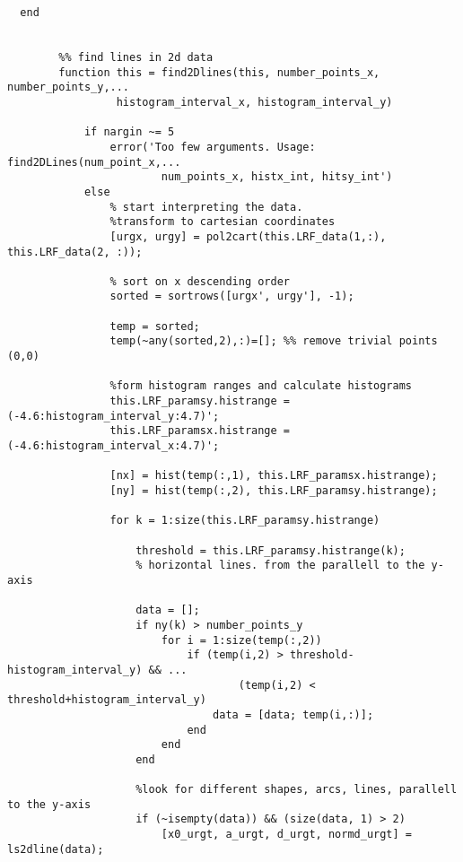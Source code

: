 \begin{lstlisting}
  end
        
        
        %% find lines in 2d data
        function this = find2Dlines(this, number_points_x, number_points_y,...
                 histogram_interval_x, histogram_interval_y)
            
            if nargin ~= 5
                error('Too few arguments. Usage: find2DLines(num_point_x,...
                        num_points_x, histx_int, hitsy_int')
            else
                % start interpreting the data.
                %transform to cartesian coordinates
                [urgx, urgy] = pol2cart(this.LRF_data(1,:), this.LRF_data(2, :));
                
                % sort on x descending order
                sorted = sortrows([urgx', urgy'], -1);
                
                temp = sorted;
                temp(~any(sorted,2),:)=[]; %% remove trivial points (0,0)
                
                %form histogram ranges and calculate histograms
                this.LRF_paramsy.histrange = (-4.6:histogram_interval_y:4.7)';
                this.LRF_paramsx.histrange = (-4.6:histogram_interval_x:4.7)';
                
                [nx] = hist(temp(:,1), this.LRF_paramsx.histrange);
                [ny] = hist(temp(:,2), this.LRF_paramsy.histrange);
                
                for k = 1:size(this.LRF_paramsy.histrange)
                    
                    threshold = this.LRF_paramsy.histrange(k);
                    % horizontal lines. from the parallell to the y-axis
                    
                    data = [];
                    if ny(k) > number_points_y
                        for i = 1:size(temp(:,2))
                            if (temp(i,2) > threshold-histogram_interval_y) && ...
                                    (temp(i,2) < threshold+histogram_interval_y)
                                data = [data; temp(i,:)];
                            end
                        end
                    end
                    
                    %look for different shapes, arcs, lines, parallell to the y-axis
                    if (~isempty(data)) && (size(data, 1) > 2)
                        [x0_urgt, a_urgt, d_urgt, normd_urgt] = ls2dline(data);
                        

\end{lstlisting}
